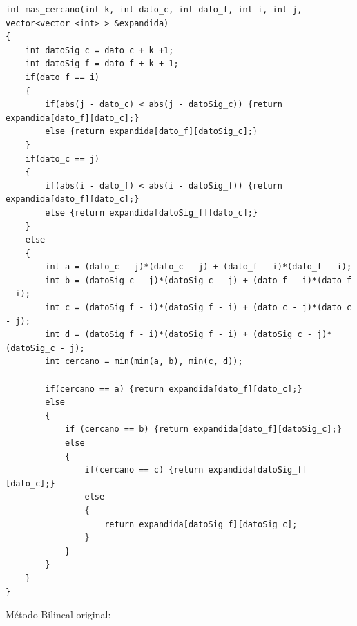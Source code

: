 \documentclass[a4paper]{article}
\begin{document}
\begin{verbatim}
int mas_cercano(int k, int dato_c, int dato_f, int i, int j, vector<vector <int> > &expandida)
{
    int datoSig_c = dato_c + k +1;
    int datoSig_f = dato_f + k + 1;
    if(dato_f == i)
    {
        if(abs(j - dato_c) < abs(j - datoSig_c)) {return expandida[dato_f][dato_c];}
        else {return expandida[dato_f][datoSig_c];}
    }
    if(dato_c == j)
    {
        if(abs(i - dato_f) < abs(i - datoSig_f)) {return expandida[dato_f][dato_c];}
        else {return expandida[datoSig_f][dato_c];}
    }
    else
    {
        int a = (dato_c - j)*(dato_c - j) + (dato_f - i)*(dato_f - i);
        int b = (datoSig_c - j)*(datoSig_c - j) + (dato_f - i)*(dato_f - i);
        int c = (datoSig_f - i)*(datoSig_f - i) + (dato_c - j)*(dato_c - j);
        int d = (datoSig_f - i)*(datoSig_f - i) + (datoSig_c - j)*(datoSig_c - j);
        int cercano = min(min(a, b), min(c, d));

        if(cercano == a) {return expandida[dato_f][dato_c];}
        else
        {
            if (cercano == b) {return expandida[dato_f][datoSig_c];}
            else
            {
                if(cercano == c) {return expandida[datoSig_f][dato_c];}
                else
                {
                    return expandida[datoSig_f][datoSig_c];
                }
            }
        }
    }
}
\end{verbatim}
Método Bilineal original:
\end{document}

